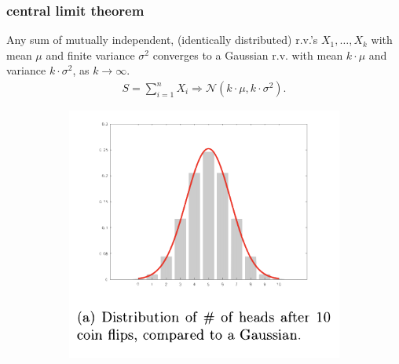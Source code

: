 \documentclass[compress]{beamer}
\begin{document}
\begin{frame}
	\frametitle{central limit theorem}
	\begin{theorem}
		Any sum of \alert{mutually independent}, \alert{(identically distributed)}  r.v.'s $X_1,  \ldots, X_k$ with mean $\mu$ and finite variance $\sigma^2$ converges to a Gaussian r.v. with mean $k\cdot\mu$ and variance $k\cdot\sigma^2$, as $k\rightarrow \infty$.
		\vspace{-.5em}
		\begin{align*}
			S = \sum_{i=1}^n X_i \Longrightarrow \mathcal{N}(k\cdot\mu, k\cdot\sigma^2).
		\end{align*}	
		\vspace{-.5em}	
	\end{theorem}
	\vspace{-.5em}	
	\begin{figure}
		\begin{subfigure}[t]{0.4\textwidth}
			\centering
			\includegraphics[width=\textwidth]{cltWide.png}
		\end{subfigure}
		\hspace{4em}
		\begin{subfigure}[t]{0.4\textwidth}
			\centering

\end{subfigure}
\end{figure}
\end{frame}
\end{document}
